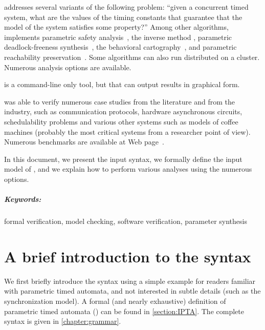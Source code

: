 \imitator{} addresses several variants of the following problem:
``given a concurrent timed system, what are the values of the timing constants that guarantee that the model of the system satisfies some property?''
Among other algorithms, \imitator{} implements
parametric safety analysis~\cite{AHV93,JLR15},
the inverse method \cite{ACEF09,AM15},
parametric deadlock-freeness synthesis~\cite{Andre16},
the behavioral cartography~\cite{AF10},
and
parametric reachability preservation~\cite{ALNS15}.
Some algorithms can also run distributed on a cluster.
Numerous analysis options are available.

\imitator{} is a command-line only tool, but that can output results in graphical form.

\imitator{} was able to verify numerous case studies from the literature and from the industry, such as communication protocols, hardware asynchronous circuits, schedulability problems and various other systems such as models of coffee machines (probably the most critical systems from a researcher point of view).
Numerous benchmarks are available at \imitator{} Web page~\cite{imitator}.

In this document, we present the input syntax, we formally define the input model of \imitator{}, and we explain how to perform various analyses using the numerous options.


\paragraph{Keywords:} formal verification, model checking, software verification, parameter synthesis



\chapter{A brief introduction to the syntax}\label{chapter:syntax-introduction}

We first briefly introduce the syntax using a simple example for readers familiar with parametric timed automata, and not interested in subtle details (such as the synchronization model).
A formal (and nearly exhaustive) definition of \imitator{} parametric timed automata (\NIPTA{}) can be found in \cref{section:IPTA}.
The complete syntax is given in \cref{chapter:grammar}.

